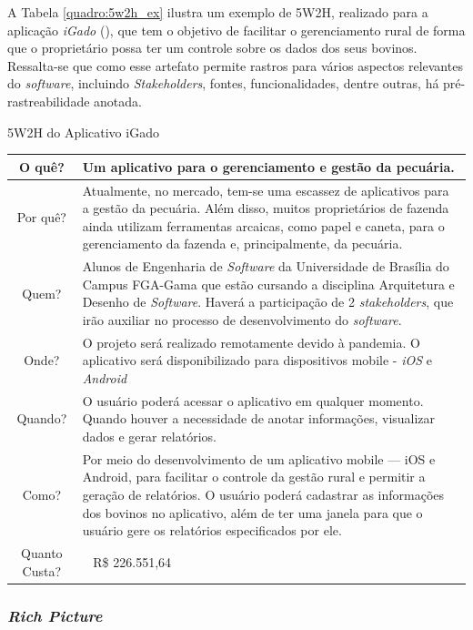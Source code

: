 A Tabela \ref{quadro:5w2h_ex} ilustra um exemplo de 5W2H, realizado para a aplicação \textit{iGado} (), que tem o objetivo de facilitar o gerenciamento rural de forma que o proprietário possa ter um controle sobre os dados dos seus bovinos. Ressalta-se que como esse artefato permite rastros para vários aspectos relevantes do \textit{software}, incluindo \textit{Stakeholders}, fontes, funcionalidades, dentre outras, há pré-rastreabilidade anotada.

\begin{quadro}
\caption{5W2H do Aplicativo iGado}
\label{quadro:5w2h_ex}
\centering
\begin{tabular}{C{0.07\textheight}|p{0.55\textheight}}
    \hline
    O quê? & Um aplicativo para o gerenciamento e gestão da pecuária.\\ \hline
    Por quê? & Atualmente, no mercado, tem-se uma escassez de aplicativos para a gestão da pecuária. Além disso, muitos proprietários de fazenda ainda utilizam ferramentas arcaicas, como papel e caneta, para o gerenciamento da fazenda e, principalmente, da pecuária. \\ \hline
    Quem? & Alunos de Engenharia de \textit{Software} da Universidade de Brasília do Campus FGA-Gama que estão cursando a disciplina Arquitetura e Desenho de \textit{Software}. Haverá a participação de 2 \textit{stakeholders}, que irão auxiliar no processo de desenvolvimento do \textit{software}. \\ \hline
    Onde? & O projeto será realizado remotamente devido à pandemia. O aplicativo será disponibilizado para dispositivos mobile - \textit{iOS} e \textit{Android} \\ \hline
    Quando? & O usuário poderá acessar o aplicativo em qualquer momento. Quando houver a necessidade de anotar informações, visualizar dados e gerar relatórios. \\ \hline
    Como? & Por meio do desenvolvimento de um aplicativo mobile — iOS e Android, para facilitar o controle da gestão rural e permitir a geração de relatórios. O usuário poderá cadastrar as informações dos bovinos no aplicativo, além de ter uma janela para que o usuário gere os relatórios especificados por ele. \\ \hline
     Quanto Custa? & ~ R\$ 226.551,64 \\ \hline
\end{tabular}
\end{quadro}

\subsubsection{\textit{Rich Picture}}

